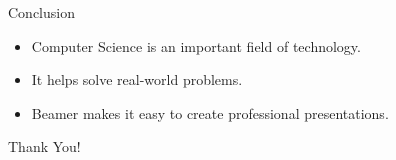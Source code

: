 \documentclass{beamer}
\begin{document}
\begin{frame}{Conclusion}

\begin{itemize}
    \item Computer Science is an important field of technology.
    \item It helps solve real-world problems.
    \item Beamer makes it easy to create professional presentations.
\end{itemize}

\vspace{0.5cm}

\centering
\Large Thank You!

\end{frame}
\end{document}
